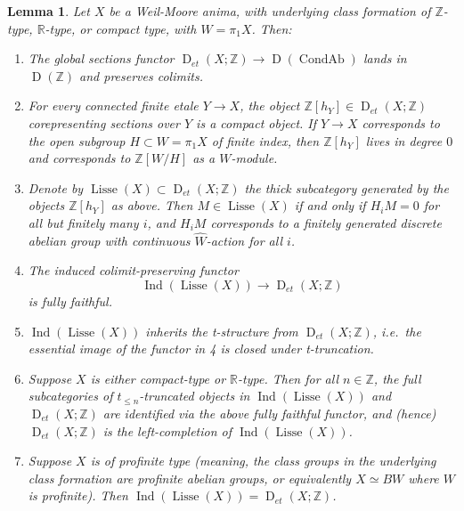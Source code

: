\documentclass[12pt]{article}
\newtheorem{lemma}[theorem]{Lemma}
\theoremstyle{definition}
\newcommand{\on}{\operatorname}
\newcommand{\mbb}{\mathbb}
\newcommand{\wh}{\widehat}
\begin{document}
\begin{lemma}\label{lisse}
Let $X$ be a Weil-Moore anima, with underlying class formation of $\mbb{Z}$-type, $\mbb{R}$-type, or compact type, with $W=\pi_1X$.  Then:

\begin{enumerate}
\item The global sections functor $\on{D}_{et}(X;\mbb{Z}) \to \on{D}(\on{CondAb})$ lands in $\on{D}(\mbb{Z})$ and preserves colimits.
\item For every connected finite etale $Y\to X$, the object $\mbb{Z}[h_Y]\in \on{D}_{et}(X;\mbb{Z})$ corepresenting sections over $Y$ is a compact object.  If $Y\to X$ corresponds to the open subgroup $H\subset W=\pi_1X$ of finite index, then $\mbb{Z}[h_Y]$ lives in degree $0$ and corresponds to $\mbb{Z}[W/H]$ as a $W$-module.
\item Denote by $\on{Lisse}(X)\subset\on{D}_{et}(X;\mbb{Z})$ the thick subcategory generated by the objects $\mbb{Z}[h_Y]$ as above.  Then $M\in\on{Lisse}(X)$ if and only if $H_iM=0$ for all but finitely many $i$, and $H_iM$ corresponds to a finitely generated discrete abelian group with continuous $\wh{W}$-action for all $i$.

\item The induced colimit-preserving functor
$$\on{Ind}(\on{Lisse}(X))\to \on{D}_{et}(X;\mbb{Z})$$
is fully faithful.
\item $\on{Ind}(\on{Lisse}(X))$ inherits the t-structure from $\on{D}_{et}(X;\mbb{Z})$, i.e.\ the essential image of the functor in 4 is closed under t-truncation.
\item Suppose $X$ is either compact-type or $\mbb{R}$-type.  Then for all $n\in\mbb{Z}$, the full subcategories of $t_{\leq n}$-truncated objects in $\on{Ind}(\on{Lisse}(X))$ and $\on{D}_{et}(X;\mbb{Z})$ are identified via the above fully faithful functor, and (hence) $\on{D}_{et}(X;\mbb{Z})$ is the left-completion of $\on{Ind}(\on{Lisse}(X))$.
\item Suppose $X$ is of profinite type (meaning, the class groups in the underlying class formation are profinite abelian groups, or equivalently $X\simeq BW$ where $W$ is profinite).  Then $\on{Ind}(\on{Lisse}(X))=\on{D}_{et}(X;\mbb{Z})$.
\end{enumerate}

\end{lemma}
\end{document}
